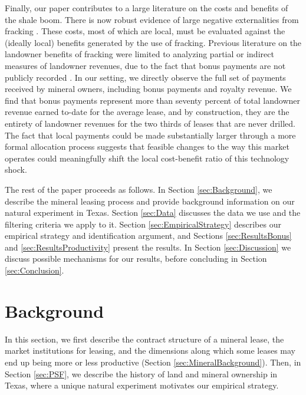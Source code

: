 \documentclass[12pt]{article}
\begin{document}
Finally, our paper contributes to a large literature on the costs and benefits of the shale boom. There is now robust evidence of large negative externalities from fracking \citep{muehlenbachs_housing_2015,currie_hydraulic_2017}. These costs, most of which are local, must be evaluated against the (ideally local) benefits generated by the use of fracking. Previous literature on the landowner benefits of fracking were limited to analyzing partial or indirect measures of landowner revenues, due to the fact that bonus payments are not publicly recorded \citep{brown_capturing_2016,feyrer_geographic_2017,bartik_local_2017}. In our setting, we directly observe the full set of payments received by mineral owners, including bonus payments and royalty revenue. We find that bonus payments represent more than seventy percent of total landowner revenue earned to-date for the average lease, and by construction, they are the entirety of landowner revenues for the two thirds of leases that are never drilled. The fact that local payments could be made substantially larger through a more formal allocation process suggests that feasible changes to the way this market operates could meaningfully shift the local cost-benefit ratio of this technology shock.

The rest of the paper proceeds as follows. In Section \ref{sec:Background}, we describe the mineral leasing process and provide background information on our natural experiment in Texas. Section \ref{sec:Data} discusses the data we use and the filtering criteria we apply to it.  Section \ref{sec:EmpiricalStrategy} describes our empirical strategy and identification argument, and Sections \ref{sec:ResultsBonus} and \ref{sec:ResultsProductivity} present the results. In Section \ref{sec:Discussion} we discuss possible mechanisms for our results, before concluding in Section \ref{sec:Conclusion}. 

\section{Background \label{sec:Background}}
In this section, we first describe the contract structure of a mineral lease, the market institutions for leasing, and the dimensions along which some leases may end up being more or less productive (Section \ref{sec:MineralBackground}). Then, in Section \ref{sec:PSF}, we describe the history of land and mineral ownership in Texas, where a unique natural experiment motivates our empirical strategy.
\end{document}

